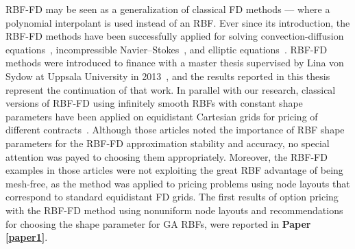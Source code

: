 \documentclass{UUThesisTemplate}
\begin{document}
\par
RBF-FD may be seen as a generalization of classical FD methods --- where a polynomial interpolant is used instead of an RBF. Ever since its introduction, the RBF-FD methods have been successfully applied for solving convection-diffusion equations~\cite{chandhini2007local, stevens2009use}, incompressible Navier--Stokes~\cite{shu2003local, shan2008application, chinchapatnam2009compact}, and elliptic equations~\cite{tolstykh2003using, wright2006scattered}. RBF-FD methods were introduced to finance with a master thesis supervised by Lina von Sydow at Uppsala University in 2013~\cite{wang2013radial}, and the results reported in this thesis represent the continuation of that work. In parallel with our research, classical versions of RBF-FD using infinitely smooth RBFs with constant shape parameters have been applied on equidistant Cartesian grids for pricing of different contracts~\cite{kadalbajoo2013application, kadalbajoo2015application, kumar2015numerical, kadalbajoo2017radial}. Although those articles noted the importance of RBF shape parameters for the RBF-FD approximation stability and accuracy, no special attention was payed to choosing them appropriately. Moreover, the RBF-FD examples in those articles were not exploiting the great RBF advantage of being mesh-free, as the method was applied to pricing problems using node layouts that correspond to standard equidistant FD grids. The first results of option pricing with the RBF-FD method using nonuniform node layouts and recommendations for choosing the shape parameter for GA RBFs, were reported in \textbf{Paper \ref{paper1}}.
%
\end{document}
